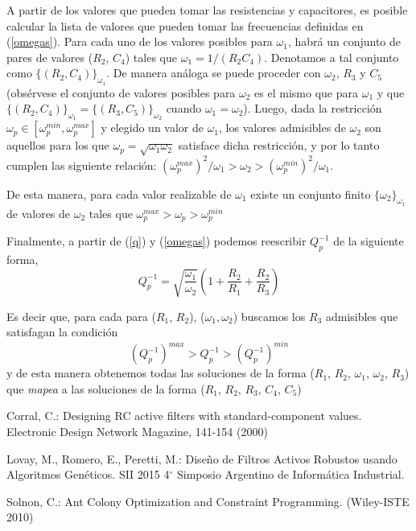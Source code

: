\documentclass{llncs}
\begin{document}
    
    A partir de los valores que pueden tomar las resistencias y capacitores, es
    posible calcular la lista de valores que pueden tomar las frecuencias
    definidas en (\ref{omegas}). Para cada uno de los valores posibles para
    $\omega_1$, habr\'a un conjunto de pares de valores ($R_2$, $C_4$) tales que
    $\omega_1 = 1/(R_2 C_4)$. Denotamos a tal conjunto como $\{(R_2,
      C_4)\}_{\omega_1}$. De manera an\'aloga se puede proceder con $\omega_2$,
      $R_3$ y $C_5$ (obs\'ervese el conjunto de valores posibles para $\omega_2$
      es el mismo que para $\omega_1$ y que $\{(R_2,C_4)\}_{\omega_1}=\{(R_3,
      C_5)\}_{\omega_2}$ cuando $\omega_1=\omega_2$). Luego, dada la restricci\'on $\omega_p \in 
    [\omega_p^{min},\omega_p^{max}]$ y elegido un valor de  $\omega_1$, los
    valores admisibles de $\omega_2$ son aquellos para los 
    que $\omega_p= \sqrt{\omega_1 \omega_2}$ satisface dicha restricci\'on, y
    por lo tanto cumplen las siguiente relaci\'on:
    $(\omega_p^{max})^2 / \omega_1 > \omega_2 > (\omega_p^{min})^2 / \omega_1 $.

    De esta manera, para cada valor realizable de $\omega_1$ existe un conjunto
    finito $\{{\omega_2}\}_{\omega_1}$ de valores de $\omega_2$ 
    tales que $ \omega_p^{max} > \omega_p > \omega_p^{min} $

    Finalmente, a partir de (\ref{q}) y (\ref{omegas}) podemos reescribir
    $Q_p^{-1}$ de la siguiente forma,
    \begin{equation}
    Q_p^{-1} = \sqrt{\frac{\omega_1}{\omega_2}}\left(1+\frac{R_2}{R_1}+\frac{R_2}{R_3}\right)
    \end{equation}
    
    Es decir que, para cada para ($R_1$, $R_2$), ($\omega_1, \omega_2$) buscamos
    los $R_3$ admisibles que satisfagan la 
    condici\'on
    $$
    (Q_p^{-1})^{max} > Q_p^{-1} > (Q_p^{-1})^{min}
    $$
    y de esta manera obtenemos todas las soluciones de la forma ($R_1$, $R_2$,
    $\omega_1$, $\omega_2$, $R_3$)  
    que \textit{mapea} a las soluciones de la forma ($R_1$, $R_2$, $R_3$, $C_4$,
    $C_5$) 

  \begin{thebibliography}{1}
      Corral, C.: 
      Designing RC active filters with standard-component values. Electronic Design
      Network Magazine, 141-154 (2000)
      
      Lovay, M., Romero, E., Peretti, M.:
      Dise\~no de Filtros Activos Robustos usando Algoritmos Gen\'eticos.
      SII 2015 4$^\circ$ Simposio Argentino de Inform\'atica Industrial.
      
      Solnon, C.:
      Ant Colony Optimization and Constraint Programming. (Wiley-ISTE 2010) 
  
  \end{thebibliography}
\end{document}
